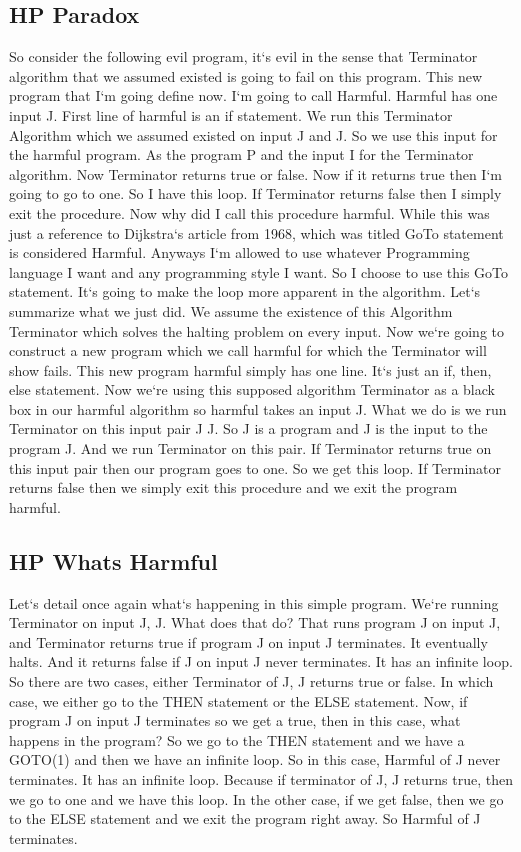 \subsection{HP  Paradox}
So consider the following evil program, it`s evil in the sense that Terminator algorithm that we assumed existed is going to fail on this program.
This new program that I`m going define now.
I`m going to call Harmful.
Harmful has one input J\@.
First line of harmful is an if statement.
We run this Terminator Algorithm which we assumed existed on input J and J\@.
So we use this input for the harmful program.
As the program P and the input I for the Terminator algorithm.
Now Terminator returns true or false.
Now if it returns true then I`m going to go to one.
So I have this loop.
If Terminator returns false then I simply exit the procedure.
Now why did I call this procedure harmful.
While this was just a reference to Dijkstra`s article from 1968, which was titled GoTo statement is considered Harmful.
Anyways I`m allowed to use whatever Programming language I want and any programming style I want.
So I choose to use this GoTo statement.
It`s going to make the loop more apparent in the algorithm.
Let`s summarize what we just did.
We assume the existence of this Algorithm Terminator which solves the halting problem on every input.
Now we`re going to construct a new program which we call harmful for which the Terminator will show fails.
This new program harmful simply has one line.
It`s just an if, then, else statement.
Now we`re using this supposed algorithm Terminator as a black box in our harmful algorithm so harmful takes an input J\@.
What we do is we run Terminator on this input pair J J\@.
So J is a program and J is the input to the program J\@.
And we run Terminator on this pair.
If Terminator returns true on this input pair then our program goes to one.
So we get this loop.
If Terminator returns false then we simply exit this procedure and we exit the program harmful.

\subsection{HP  Whats Harmful}
Let`s detail once again what`s happening in this simple program.
We`re running Terminator on input J, J\@.
What does that do? That runs program J on input J, and Terminator returns true if program J on input J terminates.
It eventually halts.
And it returns false if J on input J never terminates.
It has an infinite loop.
So there are two cases, either Terminator of J, J returns true or false.
In which case, we either go to the THEN statement or the ELSE statement.
Now, if program J on input J terminates so we get a true, then in this case, what happens in the program? So we go to the THEN statement and we have a GOTO(1) and then we have an infinite loop.
So in this case, Harmful of J never terminates.
It has an infinite loop.
Because if terminator of J, J returns true, then we go to one and we have this loop.
In the other case, if we get false, then we go to the ELSE statement and we exit the program right away.
So Harmful of J terminates.

